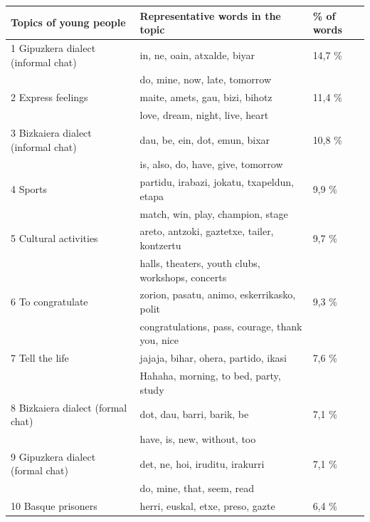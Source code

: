 \documentclass[information,article,submit,moreauthors,pdftex,10pt,a4paper]{Definitions/mdpi}
\begin{document}
\begin{table}[H]
  \centering
  \begin{tabular}{|l|l|l|}
    \hline
    \textbf{Topics of young people} &  \textbf{Representative words in the topic} & \textbf{\% of words} \\ \hline
                   1  Gipuzkera dialect (informal chat) & in, ne, oain, atxalde, biyar & 14,7 \%  \\ \hline
                   & do, mine, now, late, tomorrow & \\ \hline
                   2  Express feelings & maite, amets, gau, bizi, bihotz & 11,4 \%  \\ \hline
                   & love, dream, night, live, heart & \\ \hline
                   3  Bizkaiera dialect (informal chat) & dau, be, ein, dot, emun, bixar & 10,8 \%  \\ \hline
                   & is, also, do, have, give, tomorrow & \\ \hline
                   4  Sports & partidu, irabazi, jokatu, txapeldun, etapa & 9,9 \%  \\ \hline
                   & match, win, play, champion, stage & \\ \hline
                   5  Cultural activities & areto, antzoki, gaztetxe, tailer, kontzertu & 9,7 \%  \\ \hline
                   & halls, theaters, youth clubs, workshops, concerts & \\ \hline
                   6  To congratulate & zorion, pasatu, animo, eskerrikasko, polit & 9,3 \%  \\ \hline
                   & congratulations, pass, courage, thank you, nice & \\ \hline
                   7  Tell the life & jajaja, bihar, ohera, partido, ikasi & 7,6 \%  \\ \hline
                   & Hahaha, morning, to bed, party, study & \\ \hline
                   8  Bizkaiera dialect (formal chat) & dot, dau, barri, barik, be & 7,1 \%  \\ \hline
                   & have, is, new, without, too & \\ \hline
                   9  Gipuzkera dialect (formal chat) & det, ne, hoi, iruditu, irakurri  & 7,1 \%  \\ \hline
                   & do, mine, that, seem, read & \\ \hline
                   10 Basque prisoners & herri, euskal, etxe, preso, gazte & 6,4 \%  \\ \hline

\end{tabular}
\end{table}
\end{document}
